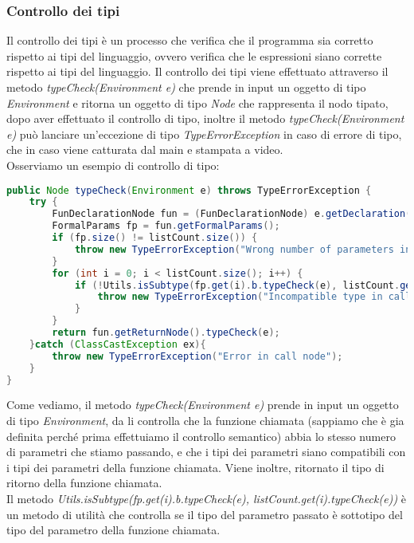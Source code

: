 \documentclass[../../main.tex]{subfiles}
\begin{document}
\subsubsection{Controllo dei tipi}
Il controllo dei tipi è un processo che verifica che il programma sia corretto rispetto ai tipi del linguaggio, ovvero verifica che le espressioni siano corrette rispetto ai tipi del linguaggio.
Il controllo dei tipi viene effettuato attraverso il metodo \textit{typeCheck(Environment e)} che prende in input un oggetto di tipo \textit{Environment} e ritorna un oggetto di tipo \textit{Node} che rappresenta il nodo tipato, dopo aver effettuato il controllo di tipo, inoltre il metodo \textit{typeCheck(Environment e)} può lanciare un'eccezione di tipo \textit{TypeErrorException} in caso di errore di tipo, che in caso viene catturata dal main e stampata a video.\\
Osserviamo un esempio di controllo di tipo:
\begin{lstlisting}[language=Java, caption={Controllo di tipo di CallNode}]
public Node typeCheck(Environment e) throws TypeErrorException {
    try {
        FunDeclarationNode fun = (FunDeclarationNode) e.getDeclaration(id.getId());
        FormalParams fp = fun.getFormalParams();
        if (fp.size() != listCount.size()) {
            throw new TypeErrorException("Wrong number of parameters in call " + id.getId());
        }
        for (int i = 0; i < listCount.size(); i++) {
            if (!Utils.isSubtype(fp.get(i).b.typeCheck(e), listCount.get(i).typeCheck(e))) {
                throw new TypeErrorException("Incompatible type in call node");
            }
        }
        return fun.getReturnNode().typeCheck(e);
    }catch (ClassCastException ex){
        throw new TypeErrorException("Error in call node");
    }
}
\end{lstlisting}
Come vediamo, il metodo \textit{typeCheck(Environment e)} prende in input un oggetto di tipo \textit{Environment}, da li controlla che la funzione chiamata (sappiamo che è gia definita perché prima effettuiamo il controllo semantico) abbia lo stesso numero di parametri che stiamo passando, e che i tipi dei parametri siano compatibili con i tipi dei parametri della funzione chiamata.
Viene inoltre, ritornato il tipo di ritorno della funzione chiamata.\\
Il metodo \textit{Utils.isSubtype(fp.get(i).b.typeCheck(e), listCount.get(i).typeCheck(e))} è un metodo di utilità che controlla se il tipo del parametro passato è sottotipo del tipo del parametro della funzione chiamata.\\
\end{document}
